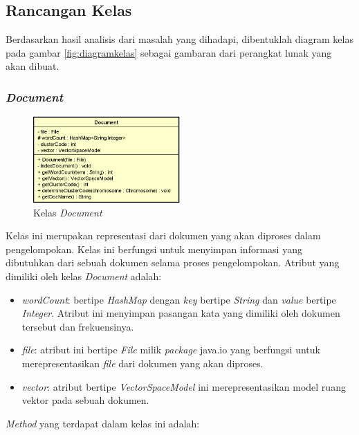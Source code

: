 \documentclass[a4paper,twoside]{article}
\begin{document}
\begin{enumerate}
\subsection*{Rancangan Kelas}
Berdasarkan hasil analisis dari masalah yang dihadapi, dibentuklah diagram kelas pada gambar \ref{fig:diagramkelas} sebagai gambaran dari perangkat lunak yang akan dibuat.

\subsubsection*{\textit{Document}}

\begin{figure}[h]
	\begin{center}
		\includegraphics[width=0.5\textwidth]{DiagramKelas/Document}
		\caption{Kelas \textit{Document}}
		\label{fig:kelasDocument}
	\end{center}
\end{figure}

Kelas ini merupakan representasi dari dokumen yang akan diproses dalam pengelompokan. Kelas ini berfungsi untuk menyimpan informasi yang dibutuhkan dari sebuah dokumen selama proses pengelompokan. Atribut yang dimiliki oleh kelas \textit{Document} adalah:

\begin{itemize}
	\item \textit{wordCount}: bertipe \textit{HashMap} dengan \textit{key} bertipe \textit{String} dan \textit{value} bertipe \textit{Integer}. Atribut ini menyimpan pasangan kata yang dimiliki oleh dokumen tersebut dan frekuensinya.
	\item \textit{file}: atribut ini bertipe \textit{File} milik \textit{package} java.io yang berfungsi untuk merepresentasikan \textit{file} dari dokumen yang akan diproses.
	\item \textit{vector}: atribut bertipe \textit{VectorSpaceModel} ini merepresentasikan model ruang vektor pada sebuah dokumen.
\end{itemize}

\textit{Method} yang terdapat dalam kelas ini adalah:


\end{enumerate}
\end{document}
